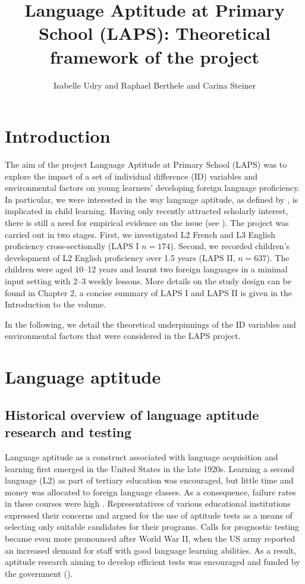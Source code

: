 \documentclass[output=paper]{langscibook}
\author{Isabelle Udry\orcid{}\affiliation{University of Fribourg, Institut de Plurilinguisme; Zurich University of Teacher Education} and Raphael Berthele\orcid{}\affiliation{University of Fribourg, Institut de Plurilinguisme} and Carina Steiner\orcid{}\affiliation{University of Berne, Center for the Study of Language and Society}}
\title[Theoretical framework of the LAPS project]
      {Language Aptitude at Primary School (LAPS): 
      Theoretical framework of the project }
\begin{document}
\maketitle 

\section{Introduction}

The aim of the project Language Aptitude at Primary School (LAPS) was to explore the impact of a set of individual difference (ID) variables and environmental factors on young learners’ developing foreign language proficiency. In particular, we were interested in the way language aptitude, as defined by \citet{Carroll1958}, is implicated in child learning. Having only recently attracted scholarly interest, there is still a need for empirical evidence on the issue (see ). The project was carried out in two stages. First, we investigated L2 French and L3 English proficiency cross-sectionally (LAPS I $n=174$). Second, we recorded children’s development of L2 English proficiency over 1.5 years (LAPS II, $n=637$). The children were aged 10--12 years and learnt two foreign languages in a minimal input setting with 2--3 weekly lessons. More details on the study design can be found in Chapter 2, a concise summary of LAPS I and LAPS II is given in the Introduction to the volume. 

In the following, we detail the theoretical underpinnings of the ID variables and environmental factors that were considered in the LAPS project. 

\section{Language aptitude}
\subsection{Historical overview of language aptitude research and testing} %

Language aptitude as a construct associated with language acquisition and learning first emerged in the United States in the late 1920s. Learning a second language (L2) as part of tertiary education was encouraged, but little time and money was allocated to foreign language classes. As a consequence, failure rates in these courses were high \citep{Spolsky1995}. Representatives of various educational institutions expressed their concerns and argued for the use of aptitude tests as a means of selecting only suitable candidates for their programs. Calls for prognostic testing became even more pronounced after World War II, when the US army reported an increased demand for staff with good language learning abilities. As a result, aptitude research aiming to develop efficient tests was encouraged and funded by the government (\citealt{StansfieldReed2004}). 
\end{document}
